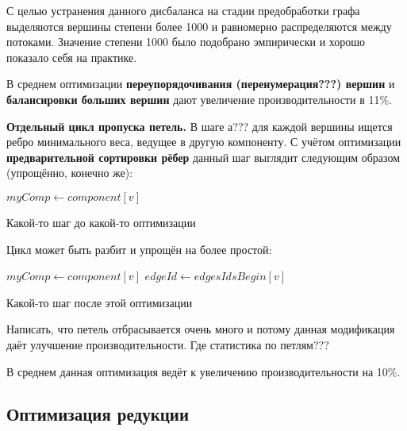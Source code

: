 \documentclass{article}
\begin{document}
С целью устранения данного дисбаланса на стадии предобработки графа выделяются вершины степени более 1000 и равномерно распределяются между потоками. Значение степени 1000 было подобрано эмпирически и хорошо показало себя на практике.

В среднем оптимизации \textbf{переупорядочивания (перенумерация???) вершин} и \textbf{балансировки больших вершин} дают увеличение производительности в 11\%.



\textbf{Отдельный цикл пропуска петель.}
В шаге а??? для каждой вершины ищется ребро минимального веса, ведущее в другую компоненту. С учётом оптимизации \textbf{предварительной сортировки рёбер} данный шаг выглядит следующим образом (упрощённо, конечно же):

\begin{algorithm}
    \SetAlgoLined
    $myComp \gets component[v]$\;
    \caption{Какой-то шаг до какой-то оптимизации}
\end{algorithm}

Цикл может быть разбит и упрощён на более простой:

\begin{algorithm}
    \SetAlgoLined
    $myComp \gets component[v]$\;
    $edgeId \gets edgesIdsBegin[v]$\;
    \caption{Какой-то шаг после этой оптимизации}
\end{algorithm}

Написать, что петель отбрасывается очень много и потому данная модификация даёт улучшение производительности. Где статистика по петлям???

В среднем данная оптимизация ведёт к увеличению производительности на 10\%.


\subsection{Оптимизация редукции}
\end{document}
